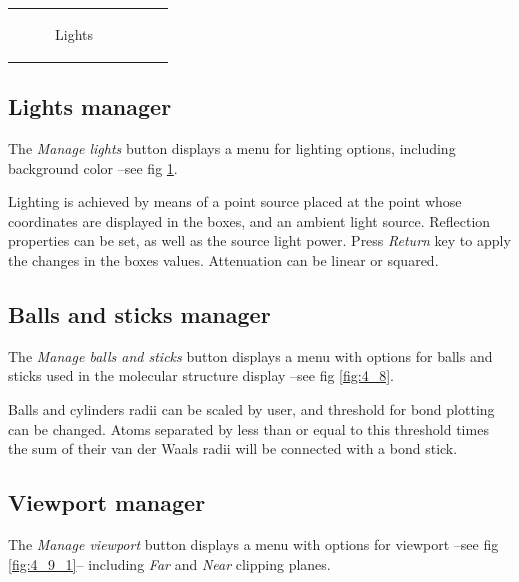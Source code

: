 \documentclass[10pt]{article}
\begin{document}
\begin{tabular}{lcr}
\begin{minipage}{.45\linewidth}
\begin{figure}[H]
\begin{center}
        \end{center}
        \vspace*{1mm}
        \caption{Lights \label{fig:4_7}}
    \end{figure}
\end{minipage}
\end{tabular}

\subsection{Lights manager \label{sec:4.7}}

The {\it Manage lights} button displays a menu for lighting options, 
including background color 
--see fig \ref{fig:4_7}.

Lighting is achieved by means of a point source placed at the point whose 
coordinates are displayed in the boxes, and an ambient light source. 
Reflection properties can be set, as well as the source light power. Press 
{\it Return} key to apply the changes in the boxes values. Attenuation can be
linear or squared.

\subsection{Balls and sticks manager \label{sec:4.8}}

The {\it Manage balls and sticks} button displays a menu with options for balls and sticks 
used in the molecular structure display --see fig \ref{fig:4_8}.

Balls and cylinders radii can be scaled by user, and threshold for
bond plotting can be changed. Atoms separated by less than or equal to this threshold
times the sum of their van der Waals radii 
will be connected with a bond stick.

\subsection{Viewport manager \label{sec:4.9}}

The {\it Manage viewport} button displays a menu with 
options for viewport --see fig \ref{fig:4_9_1}-- 
including {\it Far} and {\it Near} clipping planes. 
\end{document}
